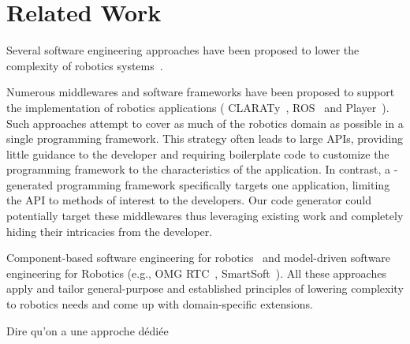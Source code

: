 \section{Related Work}
\label{sec:related}

Several software engineering approaches have been proposed to lower
the complexity of robotics systems~\cite{Brug07a}.

Numerous middlewares and software frameworks have been proposed to
support the implementation of robotics applications (\eg{}
CLARATy~\cite{Claraty}, ROS~\cite{ROS} and Player~\cite{Coll05a}).
Such approaches attempt to cover as much of the robotics domain as
possible in a single programming framework. This strategy often leads
to large APIs, providing little guidance to the developer and
requiring boilerplate code to customize the programming framework to
the characteristics of the application. In contrast, a
\diaspec{}-generated programming framework specifically targets one
application, limiting the API to methods of interest to the
developers. Our code generator could potentially target these
middlewares thus leveraging existing work and completely hiding their
intricacies from the developer.


Component-based software engineering for robotics~\cite{Brug07b} and
model-driven software engineering for Robotics (e.g., OMG
RTC~\cite{OMGRTC}, SmartSoft~\cite{Schl09a}). All these approaches
apply and tailor general-purpose and established principles of
lowering complexity to robotics needs and come up with domain-specific
extensions.

Dire qu'on a une approche dédiée